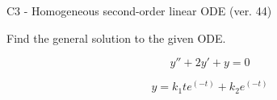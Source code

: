 \begin{exercise}
  \begin{exerciseTitle}C3 - Homogeneous second-order linear ODE (ver. 44)\end{exerciseTitle}
  \begin{exerciseStatement}
    
Find the general solution to the given ODE.

    
\[y''+2y'+y = 0\]

  \end{exerciseStatement}
  \begin{exerciseAnswer}
    
\[y= k_{1} t e^{\left(-t\right)} + k_{2} e^{\left(-t\right)}\]

  \end{exerciseAnswer}
\end{exercise}